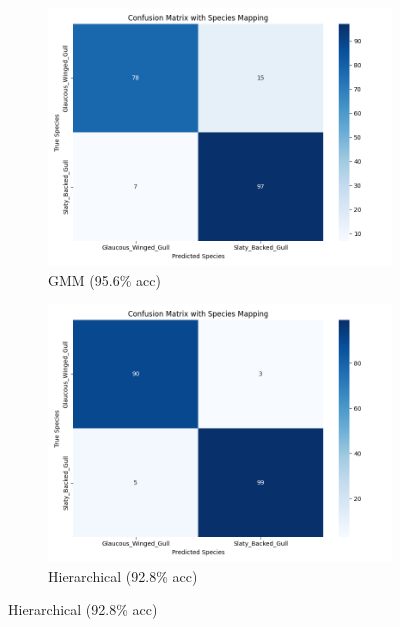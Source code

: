 \documentclass[a4paper,12pt]{report}
\begin{document}
\begin{figure}[htbp]
    \centering
    \begin{subfigure}[b]{0.32\textwidth}
        \centering
        \includegraphics[width=\textwidth]{images/clustering/gmm_confusion_matrix.png}
        \caption{GMM (95.6\% acc)}
        \label{fig:gmm_cm}
    \end{subfigure}
    \hfill
    \begin{subfigure}[b]{0.32\textwidth}
        \centering
        \includegraphics[width=\textwidth]{images/clustering/hierarchical_confusion_matrix.png}
        \caption{Hierarchical (92.8\% acc)}
        \label{fig:hierarchical_cm}
    \end{subfigure}
    \hfill

\end{figure}
\end{document}
